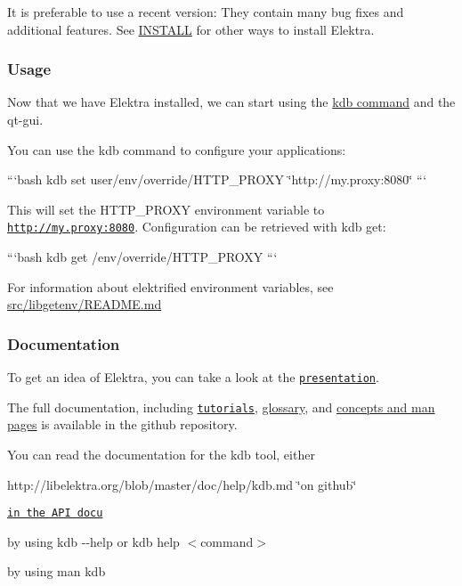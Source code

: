 It is preferable to use a recent version\+: They contain many bug fixes and additional features. See \hyperlink{doc_INSTALL_md}{I\+N\+S\+T\+A\+L\+L} for other ways to install Elektra.

\subsubsection*{Usage}

Now that we have Elektra installed, we can start using the \hyperlink{md_doc_help_kdb_doc_help_kdb_md}{kdb command} and the qt-\/gui.

You can use the {\ttfamily kdb} command to configure your applications\+:

```bash kdb set user/env/override/\+H\+T\+T\+P\+\_\+\+P\+R\+O\+X\+Y \char`\"{}http\+://my.\+proxy\+:8080\char`\"{} ```

This will set the {\ttfamily H\+T\+T\+P\+\_\+\+P\+R\+O\+X\+Y} environment variable to {\ttfamily \href{http://my.proxy:8080}{\tt http\+://my.\+proxy\+:8080}}. Configuration can be retrieved with {\ttfamily kdb get}\+:

```bash kdb get /env/override/\+H\+T\+T\+P\+\_\+\+P\+R\+O\+X\+Y ```

For information about elektrified environment variables, see \hyperlink{md_src_libgetenv_README_src_libgetenv_README_md}{src/libgetenv/\+R\+E\+A\+D\+M\+E.md}

\subsubsection*{Documentation}

To get an idea of Elektra, you can take a look at the \href{http://www.libelektra.org/ftp/elektra/presentations/2016/FOSDEM/fosdem.odp}{\tt presentation}.

The full documentation, including \href{http://libelektra.org/blob/master/doc/tutorials/}{\tt tutorials}, \hyperlink{md_doc_help_elektra-glossary_doc_help_elektra-glossary_md}{glossary}, and \hyperlink{md_doc_help_elektra-introduction_doc_help_elektra-introduction_md}{concepts and man pages} is available in the github repository.

You can read the documentation for the kdb tool, either


\begin{DoxyItemize}
\item http\+://libelektra.org/blob/master/doc/help/kdb.\+md \char`\"{}on github\char`\"{}
\item \href{http://doc.libelektra.org/api/latest/html/md_doc_help_kdb.html}{\tt in the A\+P\+I docu}
\item by using {\ttfamily kdb -\/-\/help} or {\ttfamily kdb help $<$command$>$}
\item by using {\ttfamily man kdb}
\end{DoxyItemize}

